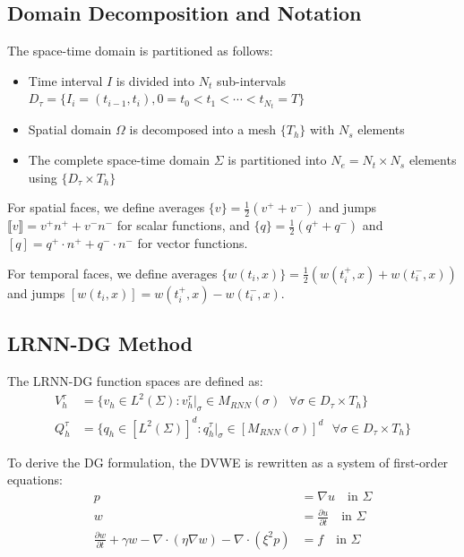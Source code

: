\documentclass[11pt,a4paper]{article}
\begin{document}
\subsection{Domain Decomposition and Notation}

The space-time domain is partitioned as follows:
\begin{itemize}
    \item Time interval $I$ is divided into $N_t$ sub-intervals $D_\tau = \{I_i = (t_{i-1}, t_i), 0 = t_0 < t_1 < \cdots < t_{N_t} = T\}$
    \item Spatial domain $\Omega$ is decomposed into a mesh $\{T_h\}$ with $N_s$ elements
    \item The complete space-time domain $\Sigma$ is partitioned into $N_e = N_t \times N_s$ elements using $\{D_\tau \times T_h\}$
\end{itemize}

For spatial faces, we define averages $\{v\} = \frac{1}{2}(v^+ + v^-)$ and jumps $\llbracket v \rrbracket = v^+ n^+ + v^- n^-$ for scalar functions, and $\{q\} = \frac{1}{2}(q^+ + q^-)$ and $[q] = q^+ \cdot n^+ + q^- \cdot n^-$ for vector functions.

For temporal faces, we define averages $\{w(t_i,x)\} = \frac{1}{2}(w(t_i^+,x) + w(t_i^-,x))$ and jumps $[w(t_i,x)] = w(t_i^+,x) - w(t_i^-,x)$.

\subsection{LRNN-DG Method}

The LRNN-DG function spaces are defined as:
\begin{align}
V_h^\tau &= \{v_h \in L^2(\Sigma) : v_h^\tau|_\sigma \in M_{RNN}(\sigma) \text{ } \forall \sigma \in D_\tau \times T_h\} \\
Q_h^\tau &= \{q_h \in [L^2(\Sigma)]^d : q_h^\tau|_\sigma \in [M_{RNN}(\sigma)]^d \text{ } \forall \sigma \in D_\tau \times T_h\}
\end{align}

To derive the DG formulation, the DVWE is rewritten as a system of first-order equations:
\begin{align}
p &= \nabla u \quad \text{in } \Sigma \\
w &= \frac{\partial u}{\partial t} \quad \text{in } \Sigma \\
\frac{\partial w}{\partial t} + \gamma w - \nabla \cdot (\eta \nabla w) - \nabla \cdot (\xi^2 p) &= f \quad \text{in } \Sigma
\end{align}
\end{document}
